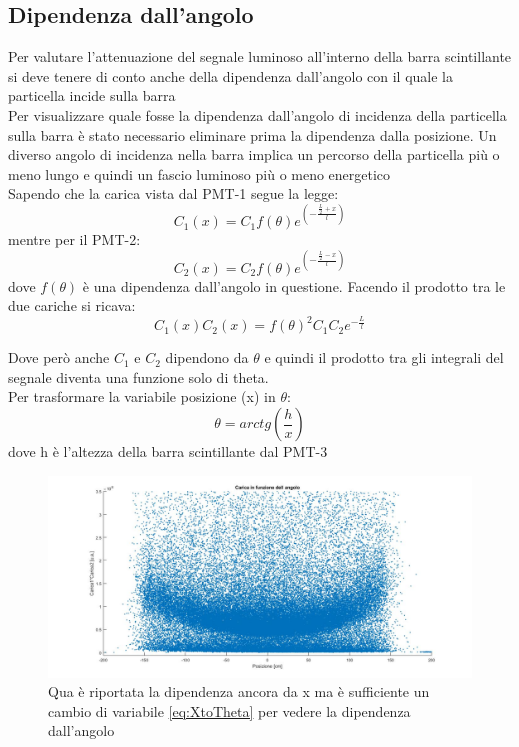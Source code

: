 \documentclass[a4paper]{article}
\begin{document}
\subsection{Dipendenza dall'angolo}
Per valutare l'attenuazione del segnale luminoso all'interno della barra scintillante si deve tenere di conto anche della dipendenza dall'angolo con il quale la particella incide sulla barra\\
Per visualizzare quale fosse la dipendenza dall'angolo di incidenza della particella sulla barra è stato necessario eliminare prima la dipendenza dalla posizione. Un diverso angolo di incidenza nella barra implica un percorso della particella più o meno lungo e quindi un fascio luminoso più o meno energetico\\
Sapendo che la carica vista dal PMT-1 segue la legge:
\begin{equation}
C_1(x) = C_1 f(\theta)e^{(-\frac{\frac{L}{2}+x}{l})}
\end{equation}
mentre per il PMT-2:
\begin{equation}
C_2(x) = C_2f(\theta)e^{(-\frac{\frac{L}{2}-x}{l})}
\end{equation}
dove $f(\theta)$ è una dipendenza dall'angolo in questione. Facendo il prodotto tra le due cariche si ricava:
\begin{equation}
C_1(x)C_2(x) = f(\theta)^2 C_1C_2 e^{-\frac{L}{l}}
\end{equation}

Dove però anche $C_1$ e $C_2$ dipendono da $\theta$ e quindi il prodotto tra gli integrali del segnale diventa una funzione solo di theta.\\
Per trasformare la variabile posizione (x) in $\theta$:
\begin{equation}
\theta = arctg(\frac{h}{x})
\label{eq:XtoTheta}
\end{equation}
dove h è l'altezza della barra scintillante dal PMT-3

\begin{figure}[H]
\centering
\includegraphics[scale=0.3]{./immagini/TimeOfFlight/DipendenzaAngolo.jpg}
\caption{Qua è riportata la dipendenza ancora da x ma è sufficiente un cambio di variabile \ref{eq:XtoTheta} per vedere la dipendenza dall'angolo}
\label{fig:DipendenzaAngolo}
\end{figure}
\end{document}
